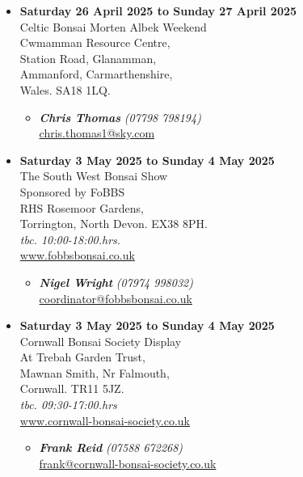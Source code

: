 \begin{itemize}
    \item \textbf{Saturday 26 April 2025 to Sunday 27 April 2025}
    \\
    Celtic Bonsai Morten Albek Weekend \\
    Cwmamman Resource Centre, \\
    Station Road, Glanamman, \\
    Ammanford, Carmarthenshire, \\
    Wales. SA18 1LQ.
    \begin{itemize}
        \item \textbf{\emph{Chris Thomas}} \emph{(07798 798194)} \\
        \href{mailto:chris.thomas1@sky.com}{chris.thomas1@sky.com}
    \end{itemize}

    \item \textbf{Saturday 3 May 2025 to Sunday 4 May 2025}
    \\
    The South West Bonsai Show \\
    Sponsored by FoBBS \\
    RHS Rosemoor Gardens, \\
    Torrington, North Devon. EX38 8PH.
    \\
    \emph{tbc. 10:00-18:00.hrs.}
    \\
    \href{https://www.fobbsbonsai.co.uk}{www.fobbsbonsai.co.uk}
    \begin{itemize}
        \item \textbf{\emph{Nigel Wright}} \emph{(07974 998032)} \\
        \href{mailto:coordinator@fobbsbonsai.co.uk}{coordinator@fobbsbonsai.co.uk}
    \end{itemize}

    \item \textbf{Saturday 3 May 2025 to Sunday 4 May 2025}
    \\
    Cornwall Bonsai Society Display \\
    At Trebah Garden Trust, \\
    Mawnan Smith, Nr Falmouth, \\
    Cornwall. TR11 5JZ.
    \\
    \emph{tbc. 09:30-17:00.hrs}
    \\
    \href{https://www.cornwall-bonsai-society.co.uk}{www.cornwall-bonsai-society.co.uk}
    \begin{itemize}
        \item \textbf{\emph{Frank Reid}} \emph{(07588 672268)} \\
        \href{mailto:frank@cornwall-bonsai-society.co.uk}{frank@cornwall-bonsai-society.co.uk}
    \end{itemize}


\end{itemize}
